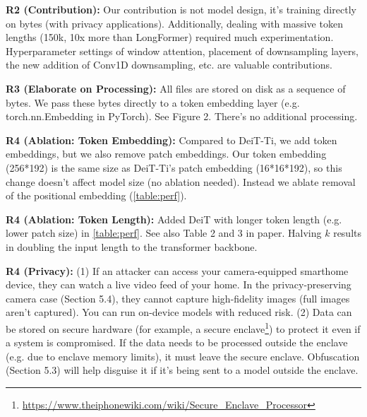 \documentclass[10pt,twocolumn,letterpaper]{article}
\begin{document}
\textbf{R2 (Contribution):} Our contribution is not model design, it's training directly on bytes (with privacy applications). Additionally, dealing with massive token lengths (150k, 10x more than LongFormer) required much experimentation. Hyperparameter settings of window attention, placement of downsampling layers, the new addition of Conv1D downsampling, etc. are valuable contributions.

\textbf{R3 (Elaborate on Processing):} All files are stored on disk as a sequence of bytes. We pass these bytes directly to a token embedding layer (e.g. torch.nn.Embedding in PyTorch). See Figure 2. There's no additional processing. %

\textbf{R4 (Ablation: Token Embedding):} Compared to DeiT-Ti, we add token embeddings, but we also remove patch embeddings. Our token embedding (256*192) is the same size as DeiT-Ti's patch embedding (16*16*192), so this change doesn't affect model size (no ablation needed). Instead we ablate removal of the positional embedding (\autoref{table:perf}).

\textbf{R4 (Ablation: Token Length):}
Added DeiT with longer token length (e.g. lower patch size) in \autoref{table:perf}. See also Table 2 and 3 in paper. Halving $k$ results in doubling the input length to the transformer backbone.

\textbf{R4 (Privacy):} (1) If an attacker can access your camera-equipped smarthome device, they can watch a live video feed of your home. In the privacy-preserving camera case (Section 5.4), they cannot capture high-fidelity images (full images aren't captured). You can run on-device models with reduced risk. (2) Data can be stored on secure hardware (for example, a secure enclave\footnote{\url{https://www.theiphonewiki.com/wiki/Secure_Enclave_Processor}}) to protect it even if a system is compromised. If the data needs to be processed outside the enclave (e.g. due to enclave memory limits), it must leave the secure enclave. Obfuscation (Section 5.3) will help disguise it if it's being sent to a model outside the enclave.


\end{document}
